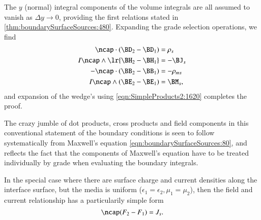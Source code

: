 The \( y \) (normal) integral components of the volume integrals are all assumed to vanish as \( \Delta y \rightarrow 0 \), providing the first relations
stated in \cref{thm:boundarySurfaceSources:480}.
Expanding the grade selection operations, we find
\begin{dmath}\label{eqn:boundarySurfaceSources:440}
\begin{aligned}
\ncap \cdot (\BD_2 - \BD_1) &= \rho_s \\
I \ncap \wedge \lr{ \BH_2 - \BH_1 } &= - \BJ_s \\
-\ncap \cdot (\BB_2 - \BB_1) &= - \rho_{ms} \\
I \ncap \wedge (\BE_2 - \BE_1) &= \BM_s,
\end{aligned}
\end{dmath}
and expansion of the wedge's using \cref{eqn:SimpleProducts2:1620} completes the proof.

The crazy jumble of dot products, cross products and field components in this conventional statement of the boundary conditions is seen to follow systematically from Maxwell's equation \cref{eqn:boundarySurfaceSources:80}, and reflects the fact that the components of Maxwell's equation have to be treated individually by grade when evaluating the boundary integrals.

In the special case where there are surface charge and current densities along the interface surface, but the media is uniform (\(\epsilon_1 = \epsilon_2, \mu_1 = \mu_2\)), then the field and current relationship has a particularily simple form \citep{chappell2014geometric}
\begin{dmath}\label{eqn:boundarySurfaceSources:421}
\ncap (F_2 - F_1) = J_s.
\end{dmath}

